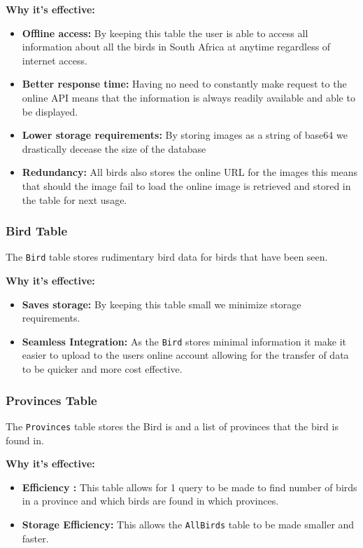 \documentclass[a4paper]{article}
\begin{document}
\textbf{Why it's effective:}
\begin{itemize}
    \item \textbf{Offline access:} By keeping this table the user is able to access all information about all the birds in South Africa at anytime regardless of internet access.
    \item \textbf{Better response time:} Having no need to constantly make request to the online API means that the information is always readily available and able to be displayed.
    \item \textbf{Lower storage requirements:} By storing images as a string of base64 we drastically decease the size of the database 
    \item \textbf{Redundancy:} All birds also stores the online URL for the images this means that should the image fail to load the online image is retrieved and stored in the table for next usage.
\end{itemize}

\subsubsection{Bird Table }
The \texttt{Bird} table stores rudimentary bird data for birds that have been seen.

\textbf{Why it's effective:}
\begin{itemize}
    \item \textbf{Saves storage:} By keeping this table small we minimize storage requirements.
    \item \textbf{Seamless Integration:} As the \texttt{Bird} stores minimal information it make it easier to upload to the users online account allowing for the transfer of data to be quicker and more cost effective.
\end{itemize}

\subsubsection{Provinces Table }
The \texttt{Provinces} table stores the Bird is and a list of provinces that the bird is found in.

\textbf{Why it's effective:}
\begin{itemize}
    \item \textbf{Efficiency :} This table allows for 1 query to be made to find number of birds in a province and which birds are found in which provinces.
    \item \textbf{Storage Efficiency:} This allows the \texttt{AllBirds} table to be made smaller and faster.
\end{itemize}
\end{document}
